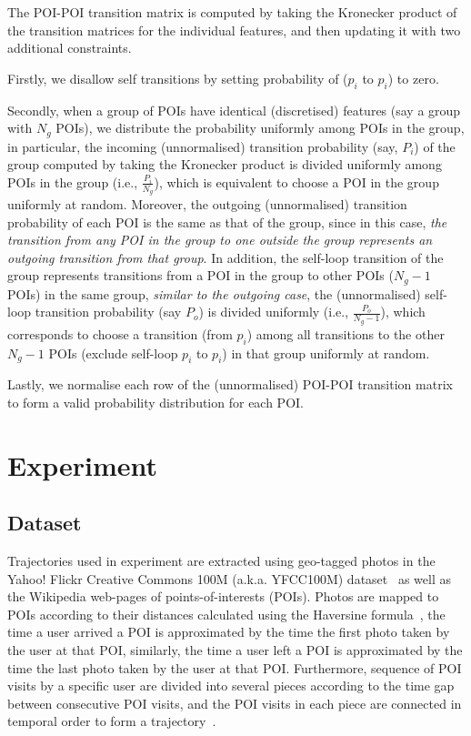 The POI-POI transition matrix is computed by taking the Kronecker product of the transition matrices for the individual features,
and then updating it with two additional constraints.

Firstly, we disallow self transitions by setting probability of ($p_i$ to $p_i$) to zero.

Secondly, when a group of POIs have identical (discretised) features (say a group with $N_g$ POIs),
we distribute the probability uniformly among POIs in the group,
in particular, the incoming (unnormalised) transition probability (say, $P_i$) of the group computed by taking the Kronecker product is divided uniformly
among POIs in the group (i.e., $\frac{P_i}{N_g}$), which is equivalent to choose a POI in the group uniformly at random.
Moreover, the outgoing (unnormalised) transition probability of each POI is the same as that of the group,
since in this case, \textit{the transition from any POI in the group to one outside the group represents an outgoing transition from that group}.
In addition, the self-loop transition of the group represents transitions from a POI in the group to other POIs ($N_g-1$ POIs) in the same group,
\textit{similar to the outgoing case}, the (unnormalised) self-loop transition probability (say $P_o$) is divided uniformly (i.e., $\frac{P_o}{N_g-1}$),
which corresponds to choose a transition (from $p_i$) among all transitions to the other $N_g-1$ POIs (exclude self-loop $p_i$ to $p_i$)
in that group uniformly at random.

Lastly, we normalise each row of the (unnormalised) POI-POI transition matrix to form a valid probability distribution for each POI.



\section{Experiment}

\subsection{Dataset}
Trajectories used in experiment are extracted using geo-tagged photos in the Yahoo! Flickr Creative Commons 100M
(a.k.a. YFCC100M) dataset~\cite{thomee2016yfcc100m} as well as the Wikipedia web-pages of points-of-interests (POIs).
Photos are mapped to POIs according to their distances calculated using the Haversine formula~\cite{haversine},
the time a user arrived a POI is approximated by the time the first photo taken by the user at that POI,
similarly, the time a user left a POI is approximated by the time the last photo taken
by the user at that POI.
Furthermore, sequence of POI visits by a specific user are divided into several pieces according to
the time gap between consecutive POI visits, and the POI visits in each piece are connected in temporal order
to form a trajectory~\cite{ht10, ijcai15}.

